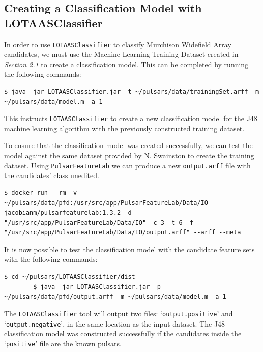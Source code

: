 \documentclass{article}
\begin{document}
\begin{appendices}
\begin{subappendices}
        \subsection{Creating a Classification Model with LOTAASClassifier}
        
        In order to use \verb|LOTAASClassifier| to classify Murchison Widefield Array candidates, we must use the Machine Learning Training Dataset created in \emph{Section 2.1} to create a classification model. This can be completed by running the following commands:
        
        \begin{lstlisting}[numbers=none]
        $ java -jar LOTAASClassifier.jar -t ~/pulsars/data/trainingSet.arff -m ~/pulsars/data/model.m -a 1
        \end{lstlisting}
        
        This instructs \verb|LOTAASClassifier| to create a new classification model for the J48 machine learning algorithm with the previously constructed training dataset.
        
        To ensure that the classification model was created successfully, we can test the model against the same dataset provided by N. Swainston to create the training dataset. Using \verb|PulsarFeatureLab| we can produce a new \verb|output.arff| file with the candidates' class unedited.
        
        \begin{lstlisting}[numbers=none]
        $ docker run --rm -v ~/pulsars/data/pfd:/usr/src/app/PulsarFeatureLab/Data/IO jacobianm/pulsarfeaturelab:1.3.2 -d "/usr/src/app/PulsarFeatureLab/Data/IO" -c 3 -t 6 -f "/usr/src/app/PulsarFeatureLab/Data/IO/output.arff" --arff --meta
        \end{lstlisting}
        
        It is now possible to test the classification model with the candidate feature sets with the following commands:
        
        \begin{lstlisting}[numbers=none]
        $ cd ~/pulsars/LOTAASClassifier/dist
        $ java -jar LOTAASClassifier.jar -p ~/pulsars/data/pfd/output.arff -m ~/pulsars/data/model.m -a 1
        \end{lstlisting}
        
        The \verb|LOTAASClassifier| tool will output two files: `\verb|output.positive|' and `\verb|output.negative|', in the same location as the input dataset. The J48 classification model was constructed successfully if the candidates inside the `\verb|positive|' file are the known pulsars.


\end{subappendices}
\end{appendices}
\end{document}
